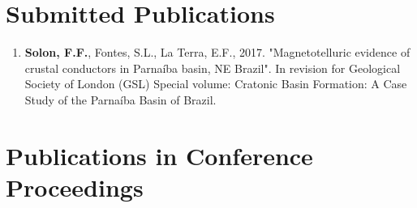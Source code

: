 \documentclass[10pt,a4paper,sans]{moderncv} %
\begin{document}
\section{Submitted Publications}

\begin{enumerate}


\item \textbf{Solon, F.F.}, Fontes, S.L., La Terra, E.F., 2017. "Magnetotelluric evidence of crustal conductors in Parna\'{i}ba basin, NE Brazil". In revision for Geological Society of London (GSL) Special volume: Cratonic Basin Formation: A Case Study of the Parna\'{i}ba Basin of Brazil.\\


\end{enumerate}


\section{Publications in Conference Proceedings}
\end{document}

